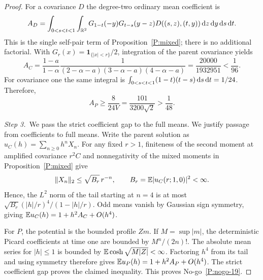 \begin{proof}
  For a covariance $D$ the degree-two ordinary mean coefficient is
  \[
    A_D=\int_{0<s<t<1}\int_{\mathbb R^2}
    G_{1-t}(-y)G_{t-s}(y-z)D((s,z),(t,y))
    \,\mathrm{d} z\,\mathrm{d} y\,\mathrm{d} s\,\mathrm{d} t.
  \]
  This is the single self-pair term of Proposition~\ref{P:mixed}; there
  is no additional factorial. With $G_r(x)=\mathbf1_{\{|x|<r\}}/2$,
  integration of the parent covariance yields
  \[
    A_C=\frac{1-a}{1-\alpha}
    \frac1{(2-\alpha-a)(3-\alpha-a)(4-\alpha-a)}
    =\frac{20000}{1932951}<\frac1{96}.
  \]
  For covariance one the same integral is
  $\int_{0<s<t<1}(1-t)(t-s)\,\mathrm{d} s\,\mathrm{d} t=1/24$. Therefore,
  \[
    A_P\ge\frac{8}{24V}
    =\frac{101}{3200\sqrt2}>\frac1{48}.
  \]


  \medskip
  \noindent\textit{Step 3.~}We pass the strict coefficient gap to the full
  means.
  We justify passage from coefficients to full means. Write the parent
  solution as $u_C(h)=\sum_{n\ge0}h^nX_n$. For any fixed $r>1$,
  finiteness of the second moment at amplified covariance $r^2C$ and
  nonnegativity of the mixed moments in Proposition~\ref{P:mixed} give
  \[
    \|X_n\|_2\le \sqrt{B_r}\,r^{-n},\qquad
    B_r=\mathbb{E}|u_C(r;1,0)|^2<\infty.
  \]
  Hence, the $L^2$ norm of the tail starting at $n=4$ is at most
  $\sqrt{B_r}(|h|/r)^4/(1-|h|/r)$. Odd means vanish by Gaussian sign
  symmetry, giving $\mathbb{E} u_C(h)=1+h^2A_C+O(h^4)$.

  For $P$, the potential is the bounded profile $Zm$. If $M=\sup|m|$,
  the deterministic Picard coefficients at time one are bounded by
  $M^n/(2n)!$. The absolute mean series for $|h|\le1$ is bounded by
  $\mathbb{E}\cosh\sqrt{M|Z|}<\infty$. Factoring $h^4$ from its tail and
  using symmetry therefore gives $\mathbb{E} u_P(h)=1+h^2A_P+O(h^4)$.
  The strict coefficient gap proves the claimed inequality.
  This proves No-go~\ref{P:nogo-19}.
\end{proof}

